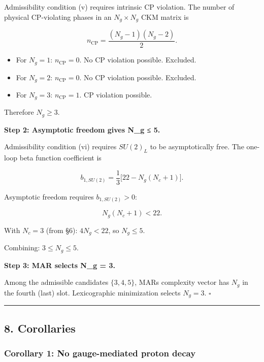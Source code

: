 Admissibility condition (v) requires intrinsic CP violation. The number of physical CP-violating phases in an \(N_g \times N_g\) CKM matrix is

\[n_{\mathrm{CP}} = \frac{(N_g - 1)(N_g - 2)}{2}.\]

\begin{itemize}
\tightlist
\item
  For \(N_g = 1\): \(n_{\mathrm{CP}} = 0\). No CP violation possible. Excluded.
\item
  For \(N_g = 2\): \(n_{\mathrm{CP}} = 0\). No CP violation possible. Excluded.
\item
  For \(N_g = 3\): \(n_{\mathrm{CP}} = 1\). CP violation possible.
\end{itemize}

Therefore \(N_g \geq 3\).

\textbf{Step 2: Asymptotic freedom gives N\_g ≤ 5.}

Admissibility condition (vi) requires \(SU(2)_L\) to be asymptotically free. The one-loop beta function coefficient is

\[b_{1,SU(2)} = \frac{1}{3}\bigl[22 - N_g(N_c + 1)\bigr].\]

Asymptotic freedom requires \(b_{1,SU(2)} > 0\):

\[N_g(N_c + 1) < 22.\]

With \(N_c = 3\) (from §6): \(4N_g < 22\), so \(N_g \leq 5\).

Combining: \(3 \leq N_g \leq 5\).

\textbf{Step 3: MAR selects N\_g = 3.}

Among the admissible candidates \(\{3, 4, 5\}\), MAR\textquotesingle s complexity vector has \(N_g\) in the fourth (last) slot. Lexicographic minimization selects \(N_g = 3\). \(\square\)

\begin{center}\rule{0.5\linewidth}{0.5pt}\end{center}

\subsection{8. Corollaries}\label{8-corollaries}

\subsubsection{Corollary 1: No gauge-mediated proton decay}\label{corollary-1-no-gauge-mediated-proton-decay}

